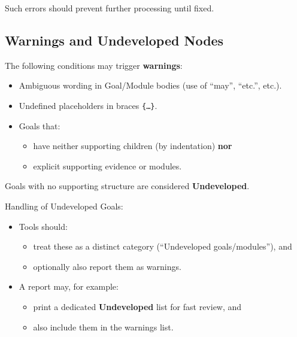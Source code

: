 \documentclass[11pt]{article}
\begin{document}
Such errors should prevent further processing until fixed.

\subsection{Warnings and Undeveloped Nodes}

The following conditions may trigger \textbf{warnings}:

\begin{itemize}[leftmargin=2em]
  \item Ambiguous wording in Goal/Module bodies (use of ``may'', ``etc.'', etc.).
  \item Undefined placeholders in braces \texttt{\{\dots\}}.
  \item Goals that:
  \begin{itemize}[leftmargin=1.5em]
    \item have neither supporting children (by indentation) \textbf{nor}
    \item explicit supporting evidence or modules.
  \end{itemize}
\end{itemize}

Goals with no supporting structure are considered \textbf{Undeveloped}.

Handling of Undeveloped Goals:

\begin{itemize}[leftmargin=2em]
  \item Tools should:
  \begin{itemize}[leftmargin=1.5em]
    \item treat these as a distinct category (``Undeveloped goals/modules''), and
    \item optionally also report them as warnings.
  \end{itemize}
  \item A report may, for example:
  \begin{itemize}[leftmargin=1.5em]
    \item print a dedicated \textbf{Undeveloped} list for fast review, and
    \item also include them in the warnings list.
  \end{itemize}
\end{itemize}
\end{document}

